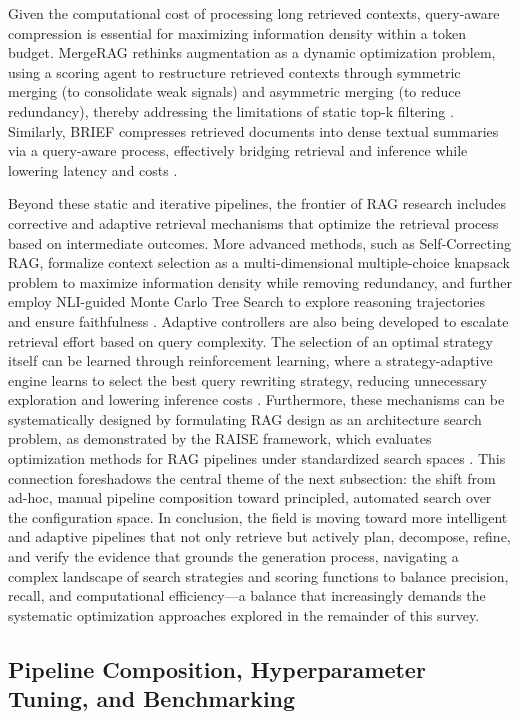 \documentclass[11pt]{article}
\begin{document}
Given the computational cost of processing long retrieved contexts, query-aware compression is essential for maximizing information density within a token budget. MergeRAG rethinks augmentation as a dynamic optimization problem, using a scoring agent to restructure retrieved contexts through symmetric merging (to consolidate weak signals) and asymmetric merging (to reduce redundancy), thereby addressing the limitations of static top-k filtering \cite{ref141}. Similarly, BRIEF compresses retrieved documents into dense textual summaries via a query-aware process, effectively bridging retrieval and inference while lowering latency and costs \cite{ref142}.

Beyond these static and iterative pipelines, the frontier of RAG research includes corrective and adaptive retrieval mechanisms that optimize the retrieval process based on intermediate outcomes. More advanced methods, such as Self-Correcting RAG, formalize context selection as a multi-dimensional multiple-choice knapsack problem to maximize information density while removing redundancy, and further employ NLI-guided Monte Carlo Tree Search to explore reasoning trajectories and ensure faithfulness \cite{ref143}. Adaptive controllers are also being developed to escalate retrieval effort based on query complexity. The selection of an optimal strategy itself can be learned through reinforcement learning, where a strategy-adaptive engine learns to select the best query rewriting strategy, reducing unnecessary exploration and lowering inference costs \cite{ref132}. Furthermore, these mechanisms can be systematically designed by formulating RAG design as an architecture search problem, as demonstrated by the RAISE framework, which evaluates optimization methods for RAG pipelines under standardized search spaces \cite{ref144}. This connection foreshadows the central theme of the next subsection: the shift from ad-hoc, manual pipeline composition toward principled, automated search over the configuration space. In conclusion, the field is moving toward more intelligent and adaptive pipelines that not only retrieve but actively plan, decompose, refine, and verify the evidence that grounds the generation process, navigating a complex landscape of search strategies and scoring functions to balance precision, recall, and computational efficiency---a balance that increasingly demands the systematic optimization approaches explored in the remainder of this survey.

\subsection{Pipeline Composition, Hyperparameter Tuning, and Benchmarking}
\end{document}
